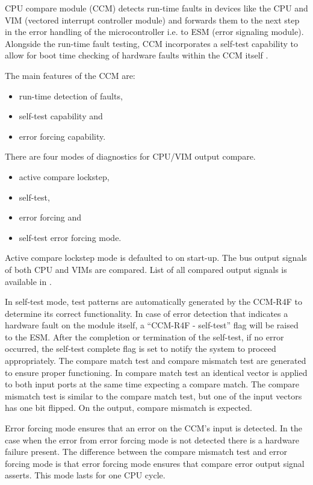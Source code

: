 CPU compare module (CCM) detects run-time faults in devices like the CPU and VIM (vectored interrupt controller module) and forwards them to the next step in the error handling of the microcontroller i.e. to ESM (error signaling module). Alongside the run-time fault testing, CCM incorporates a self-test capability to allow for boot time checking of hardware faults within the CCM itself \citep{TMS570LS31x21x_manual}.

The main features of the CCM are:
\begin{itemize}

    \item{run-time detection of faults,}
    \item{self-test capability and}
    \item{error forcing capability.}

\end{itemize}

There are four modes of diagnostics for CPU/VIM output compare.
\begin{itemize}

    \item active compare lockstep,
    \item self-test,
    \item error forcing and
    \item self-test error forcing mode.

\end{itemize}

Active compare lockstep mode is defaulted to on start-up. The bus output signals of both CPU and VIMs are compared. List of all compared output signals is available in \citep[p. 500]{TMS570LS31x21x_manual}.

In self-test mode, test patterns are automatically generated by the CCM-R4F to
determine its correct functionality. In case of error detection that indicates a
hardware fault on the module itself, a “CCM-R4F - self-test” flag will be raised to
the ESM. After the completion or termination of the self-test, if no error occurred,
the self-test complete flag is set to notify the system to proceed appropriately. The compare match test and compare mismatch test are generated to ensure proper functioning. In compare match test an identical vector is applied to both input ports at the same time expecting a compare match. The compare mismatch test is similar to the compare match test, but one of the input vectors has one bit flipped. On the output, compare mismatch is expected.

Error forcing mode ensures that an error on the CCM's input is detected. In the case when the error from error forcing mode is not detected there is a hardware failure present. The difference between the compare mismatch test and error forcing mode is that error forcing mode ensures that compare error output signal asserts. This mode lasts for one CPU cycle.
